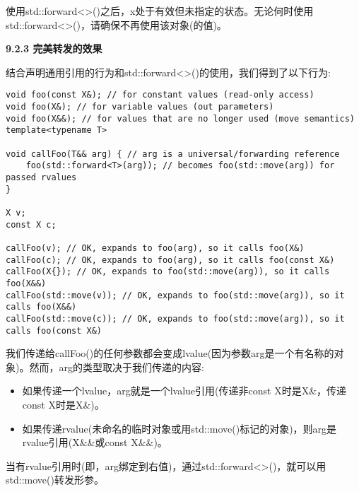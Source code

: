 使用std::forward<>()之后，x处于有效但未指定的状态。无论何时使用std::forward<>()，请确保不再使用该对象(的值)。\par

\hspace*{\fill} \par %
\textbf{9.2.3 完美转发的效果}

结合声明通用引用的行为和std::forward<>()的使用，我们得到了以下行为:\par

\begin{lstlisting}[caption={}]
void foo(const X&); // for constant values (read-only access)
void foo(X&); // for variable values (out parameters)
void foo(X&&); // for values that are no longer used (move semantics)
template<typename T>

void callFoo(T&& arg) { // arg is a universal/forwarding reference
	foo(std::forward<T>(arg)); // becomes foo(std::move(arg)) for passed rvalues
}

X v;
const X c;

callFoo(v); // OK, expands to foo(arg), so it calls foo(X&)
callFoo(c); // OK, expands to foo(arg), so it calls foo(const X&)
callFoo(X{}); // OK, expands to foo(std::move(arg)), so it calls foo(X&&)
callFoo(std::move(v)); // OK, expands to foo(std::move(arg)), so it calls foo(X&&)
callFoo(std::move(c)); // OK, expands to foo(std::move(arg)), so it calls foo(const X&)
\end{lstlisting}

我们传递给callFoo()的任何参数都会变成lvalue(因为参数arg是一个有名称的对象)。然而，arg的类型取决于我们传递的内容:\par

\begin{itemize}
	\item 如果传递一个lvalue，arg就是一个lvalue引用(传递非const X时是X\&，传递const X时是X\&)。
	\item 如果传递rvalue(未命名的临时对象或用std::move()标记的对象)，则arg是rvalue引用(X\&\&或const X\&\&)。
\end{itemize}

当有rvalue引用时(即，arg绑定到右值)，通过std::forward<>()，就可以用std::move()转发形参。\par




















